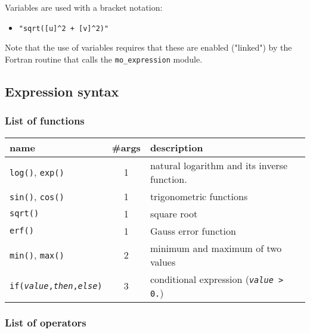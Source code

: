 Variables are used with a bracket notation:
\begin{itemize}
 \item \verb;"sqrt([u]^2 + [v]^2)";
\end{itemize}
Note that the use of variables requires that these are enabled
("linked") by the Fortran routine that calls the
\texttt{mo\_expression} module.


\subsection{Expression syntax}

\subsubsection{List of functions}

\begin{tabular}{|l|c|p{7cm}|}
  \hline
  name                           & \#args & description \\
  \hline\hline
  \texttt{log()}, \texttt{exp()} & 1                & natural logarithm and its inverse function. \\
  \texttt{sin()}, \texttt{cos()} & 1                & trigonometric functions                     \\
  \texttt{sqrt()}                & 1                & square root                                 \\
  \texttt{erf()}                 & 1                & Gauss error function                        \\
  \texttt{min()}, \texttt{max()} & 2                & minimum and maximum of two values           \\
  \texttt{if(\textit{value},\textit{then},\textit{else})} & 3 & conditional expression 
                                                      (\texttt{\textit{value} > 0.})              \\
  \hline
\end{tabular}


\subsubsection{List of operators}


